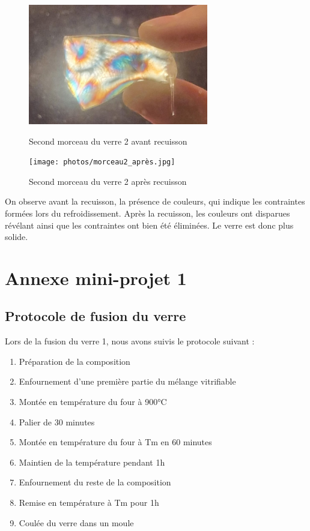 \documentclass{article}
\begin{document}
\begin{figure}[ht]
    \centering
    \begin{minipage}{0.45\textwidth}
        \centering
        \includegraphics[width=0.7\textwidth]{photos/morceau2_avant.jpg}
        \caption{Second morceau du verre 2 avant recuisson}
    \end{minipage}
    \hspace{0.5cm}
    \begin{minipage}{0.45\textwidth}
        \centering
        \texttt{[image: photos/morceau2\_après.jpg]}
        \caption{Second morceau du verre 2 après recuisson}
    \end{minipage}
\end{figure}

On observe avant la recuisson, la présence de couleurs, qui indique les contraintes formées lors du refroidissement. Après la recuisson, les couleurs ont disparues révélant ainsi que les contraintes ont bien été éliminées. Le verre est donc plus solide.

\section{Annexe mini-projet 1}
\subsection{Protocole de fusion du verre}

Lors de la fusion du verre 1, nous avons suivis le protocole suivant :

\begin{enumerate}
    \item Préparation de la composition
    \item Enfournement d'une première partie du mélange vitrifiable
    \item Montée en température du four à 900°C
    \item Palier de 30 minutes
    \item Montée en température du four à Tm en 60 minutes
    \item Maintien de la température pendant 1h
    \item Enfournement du reste de la composition
    \item Remise en température à Tm pour 1h
    \item Coulée du verre dans un moule
\end{enumerate}
\end{document}
